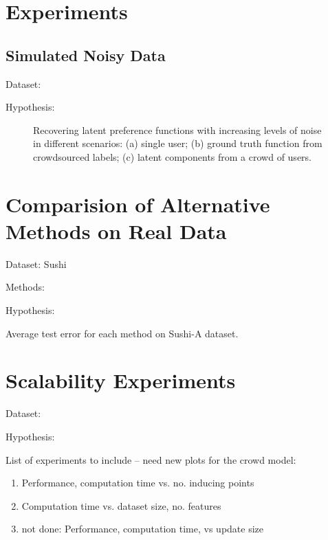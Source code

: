 \section{Experiments}\label{sec:expts}

\subsection{Simulated Noisy Data}\label{sec:exp_synth}

Dataset:

Hypothesis: 

\begin{figure}
\caption{Recovering latent preference functions with increasing levels of noise
in different scenarios: 
(a) single user; 
(b) ground truth function from crowdsourced labels; 
(c) latent components from a crowd of users.
}
\end{figure}

\section{Comparision of Alternative Methods on Real Data}\label{sec:exp_small}

Dataset: Sushi

Methods:

Hypothesis: 

\begin{table}
\caption{
Average test error for each method on Sushi-A dataset.
}
\end{table}

\section{Scalability Experiments}\label{sec:exp_scale}

Dataset:

Hypothesis: 

List of experiments to include -- need new plots for the crowd model:
\begin{enumerate}
\item Performance, computation time vs. no. inducing points
\item Computation time vs. dataset size, no. features
\item not done: Performance, computation time, vs update size
\end{enumerate}

